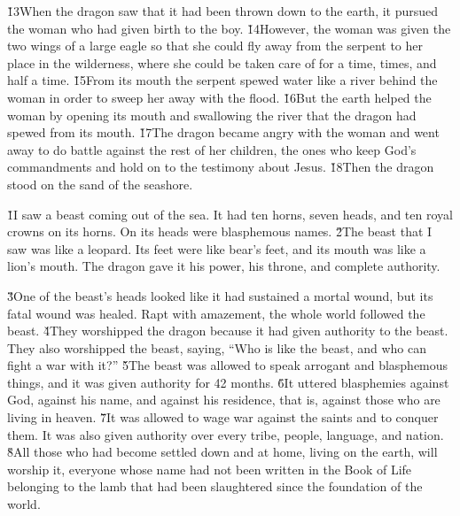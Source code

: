 \v{13}When the dragon saw that it had been thrown down to the earth, it pursued the woman who had given birth to the boy. \v{14}However, the woman was given the two wings of a large eagle so that she could fly away from the serpent to her place in the wilderness, where she could be taken care of for a time, times, and half a time. \v{15}From its mouth the serpent spewed water like a river behind the woman in order to sweep her away with the flood. \v{16}But the earth helped the woman by opening its mouth and swallowing the river that the dragon had spewed from its mouth. \v{17}The dragon became angry with the woman and went away to do battle against the rest of her children, the ones who keep God's commandments and hold on to the testimony about Jesus. \v{18}Then the dragon stood on the sand of the seashore.

\v{1}I saw a beast coming out of the sea. It had ten horns, seven heads, and ten royal crowns on its horns. On its heads were blasphemous names. \v{2}The beast that I saw was like a leopard. Its feet were like bear's feet, and its mouth was like a lion's mouth. The dragon gave it his power, his throne, and complete authority.

\v{3}One of the beast's heads looked like it had sustained a mortal wound, but its fatal wound was healed. Rapt with amazement, the whole world followed the beast. \v{4}They worshipped the dragon because it had given authority to the beast. They also worshipped the beast, saying, ``Who is like the beast, and who can fight a war with it?'' \v{5}The beast was allowed to speak arrogant and blasphemous things, and it was given authority for 42 months. \v{6}It uttered blasphemies against God, against his name, and against his residence, that is, against those who are living in heaven. \v{7}It was allowed to wage war against the saints and to conquer them. It was also given authority over every tribe, people, language, and nation. \v{8}All those who had become settled down and at home, living on the earth, will worship it, everyone whose name had not been written in the Book of Life belonging to the lamb that had been slaughtered since the foundation of the world.

